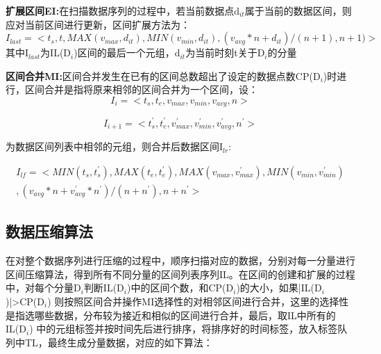 \textbf{扩展区间EI:}在扫描数据序列的过程中，若当前数据点d$_{it}$属于当前的数据区间，则应对当前区间进行更新，区间扩展方法为：
\begin{equation}
I_{last}=<t_{s},t,MAX(v_{max},d_{it}),MIN(v_{min},d_{it}),(v_{avg}*n+d_{it})/(n+1),n+1)>
\end{equation}
其中I$_{last}$为IL(D$_{i}$)区间的最后一个元组，d$_{it}$为当前时刻t关于D$_{i}$的分量


\textbf{区间合并MI:}区间合并发生在已有的区间总数超出了设定的数据点数CP(D$_{i}$)时进行，区间合并是指将原来相邻的区间合并为一个区间，设：
\begin{equation}
I_{i}=<t_{s},t_{e},v_{max},v_{min},v_{avg},n>
\end{equation}


\begin{equation}
I_{i+1}=<t_{s}^{'},t_{e}^{'},v_{max}^{'},v_{min}^{'},v_{avg}^{'},n^{'}>
\end{equation}

为数据区间列表中相邻的元组，则合并后数据区间I$_{lr}$:

\begin{equation}
\begin{split}
I_{lf}=<MIN(t_{s},t_{s}^{'}),MAX(t_{e},t_{e}^{'}),MAX(v_{max},v_{max}^{'}),MIN(v_{min},v_{min}^{'})\\
,(v_{avg}*n+v_{avg}^{'}*n^{'})/(n+n^{'}),n+n^{'}>
\end{split}
\end{equation}


\subsection{数据压缩算法}
\label{3.14}
在对整个数据序列进行压缩的过程中，顺序扫描对应的数据，分别对每一分量进行区间压缩算法，得到所有不同分量的区间列表序列IL。在区间的创建和扩展的过程
中，对每个分量D$_{i}$判断IL(D$_{i}$)中的区间个数，和CP(D$_{i}$)的大小，如果|IL(D$_{i}$)|>CP(D$_{i}$)
则按照区间合并操作MI选择性的对相邻区间进行合并，这里的选择性是指选哪些数据，分布较为接近和相似的区间进行合并，最后，取IL中所有的IL(D$_{i}$)
中的元组标签并按时间先后进行排序，将排序好的时间标签，放入标签队列中TL，最终生成分量数据，对应的如下算法：
\newpage


